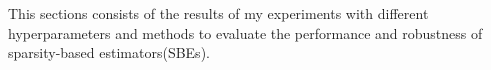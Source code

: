 This sections consists of the results of my experiments with different hyperparameters and methods to evaluate the performance and robustness of sparsity-based estimators(SBEs).

